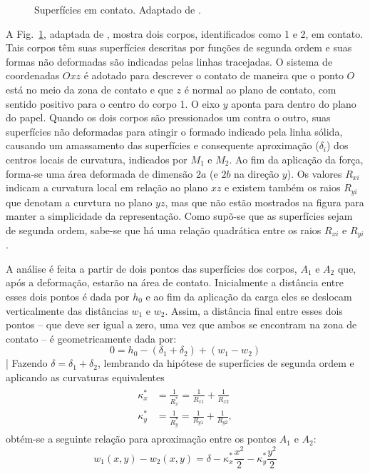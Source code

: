 \begin{figure}
    \centering
    
    \caption{Superfícies em contato. Adaptado de .}
    \label{fig: Hertz}
\end{figure}

A Fig.~\ref{fig: Hertz}, adaptada de , mostra dois corpos, identificados como 1 e 2, em contato. Tais corpos têm suas superfícies descritas por funções de segunda ordem e suas formas não deformadas são indicadas pelas linhas tracejadas. O sistema de coordenadas $Oxz$ é adotado para descrever o contato de maneira que o ponto $O$ está no meio da zona de contato e que $z$ é normal ao plano de contato, com sentido positivo para o centro do corpo 1. O eixo $y$ aponta para dentro do plano do papel. Quando os dois corpos são pressionados um contra o outro, suas superfícies não deformadas para atingir o formado indicado pela linha sólida, causando um amassamento das superfícies e consequente aproximação ($\delta_i$) dos centros locais de curvatura, indicados por $M_1$ e $M_2$. Ao fim da aplicação da força, forma-se uma área deformada de dimensão $2a$ (e $2b$ na direção $y$). Os valores $R_{xi}$ indicam a curvatura local em relação ao plano $xz$ e existem também os raios $R_{yi}$ que denotam a curvtura no plano $yz$, mas que não estão mostrados na figura para manter a simplicidade da representação. Como supõ-se que as superfícies sejam de segunda ordem, sabe-se que há uma relação quadrática entre os raios $R_{xi}$ e $R_{yi}$. 

A análise é feita a partir de dois pontos das superfícies dos corpos, $A_1$ e $A_2$ que, após a deformação, estarão na área de contato. Inicialmente a distância entre esses dois pontos é dada por $h_0$ e ao fim da aplicação da carga eles se deslocam verticalmente das distâncias $w_1$ e $w_2$. Assim, a distância final entre esses dois pontos -- que deve ser igual a zero, uma vez que ambos se encontram na zona de contato -- é geometricamente dada por:
\begin{equation}
    0  = h_0 - \left(\delta_1+\delta_2\right) + \left(w_1-w_2\right)
\end{equation}
|
Fazendo $\delta = \delta_1+\delta_2$, lembrando da hipótese de superfícies de segunda ordem e aplicando as curvaturas equivalentes
\begin{align}
    \begin{split}
        \kappa_x^* &= \frac{1}{R_x^*} = \frac{1}{R_{x1}} + \frac{1}{R_{x2}} \\
        \kappa_y^* &= \frac{1}{R_y^*} = \frac{1}{R_{y1}} + \frac{1}{R_{y2}},
    \end{split}
    \label{eq: raios_eqv_curvatura}
\end{align}
obtém-se a seguinte relação para aproximação entre os pontos $A_1$ e $A_2$:
\begin{equation}
    w_1(x,y) - w_2(x,y) = \delta - \kappa_x^* \frac{x^2}{2} -  \kappa_y^* \frac{y^2}{2}
    \label{eq: desl geometrico contato}
\end{equation}


